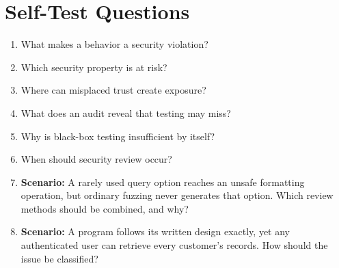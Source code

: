 \documentclass[11pt,letterpaper]{article}
\begin{document}
\section{Self-Test Questions}
\begin{enumerate}
\item What makes a behavior a security violation?
\item Which security property is at risk?
\item Where can misplaced trust create exposure?
\item What does an audit reveal that testing may miss?
\item Why is black-box testing insufficient by itself?
\item When should security review occur?
\item \textbf{Scenario:} A rarely used query option reaches an unsafe formatting operation, but ordinary fuzzing never generates that option. Which review methods should be combined, and why?
\item \textbf{Scenario:} A program follows its written design exactly, yet any authenticated user can retrieve every customer's records. How should the issue be classified?
\end{enumerate}
\clearpage
\end{document}
